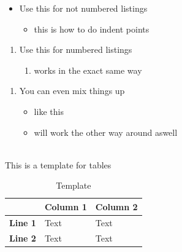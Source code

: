 \documentclass[openany]{scrreprt}
\begin{document}
\begin{itemize}
\item Use this for not numbered listings
	\begin{itemize}
	\item this is how to do indent points
	\end{itemize}
\end{itemize}

\begin{enumerate}
\item Use this for numbered listings
	\begin{enumerate}
	\item works in the exact same way
	\end{enumerate}
\end{enumerate}

\begin{enumerate}
\item You can even mix things up
	\begin{itemize}
	\item like this
	\item will work the other way around aswell
	\end{itemize}
\end{enumerate}

\ \\

This is a template for tables
\begin{table}[!h]
\begin{tabular}{@{}cll@{}}
\toprule
\multicolumn{1}{l}{}                    & \multicolumn{1}{c}{\cellcolor[HTML]{AFAFAF}\textbf{Column 1}} & \multicolumn{1}{c}{\cellcolor[HTML]{AFAFAF}\textbf{Column 2}} \\ \midrule
\cellcolor[HTML]{AFAFAF}\textbf{Line 1} & Text                                                          & Text                                                          \\
\cellcolor[HTML]{AFAFAF}\textbf{Line 2} & Text                                                          & Text                                                          \\ \bottomrule
\end{tabular}
\caption{Template}
\label{tbl:example-table}
\end{table}
\end{document}
